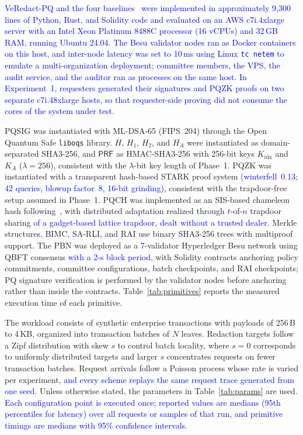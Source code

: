 \documentclass[lettersize,journal]{IEEEtran}
\newcommand{\chg}[1]{\textcolor{blue}{#1}}
\begin{document}
    \chg{VeRedact-PQ and the four baselines~\cite{ref1,ref13,ref27,ref34} were
    implemented in approximately 9{,}300 lines of Python, Rust, and Solidity
    code and evaluated on an AWS c7i.4xlarge server with an Intel Xeon
    Platinum 8488C processor (16 vCPUs) and 32\,GB RAM, running Ubuntu 24.04.
    The Besu validator nodes ran as Docker containers on this host, and
    inter-node latency was set to 10\,ms using Linux \texttt{tc netem} to
    emulate a multi-organization deployment; committee members, the VPS, the
    audit service, and the auditor ran as processes on the same host. In
    Experiment~1, requesters generated their signatures and PQZK proofs on
    two separate c7i.48xlarge hosts, so that requester-side proving did not
    consume the cores of the system under test.}

    PQSIG was instantiated with ML-DSA-65 (FIPS~204) through the Open Quantum
    Safe \texttt{liboqs} library. $H$, $H_1$, $H_2$, and $H_A$ were
    instantiated as domain-separated SHA3-256, and $\mathsf{PRF}$ as
    HMAC-SHA3-256 with 256-bit keys $K_{\mathrm{idx}}$
    and $K_A$ { ($\lambda=256$)}, consistent with the {$\lambda$}-bit key length of Phase~1. PQZK was instantiated with a transparent hash-based
    STARK proof system \chg{(winterfell~0.13; 42 queries, blowup factor~8,
    16-bit grinding)}, consistent with the
    trapdoor-free setup assumed in Phase~1. PQCH was implemented as an
    SIS-based chameleon hash following~\cite{ref10,ref17}, with distributed
    adaptation realized through $t$-of-$n$ trapdoor sharing
    \chg{of a gadget-based lattice trapdoor, dealt without a trusted dealer}. Merkle structures, BIMC, SA-RLI,
    and RAI use binary SHA3-256 trees with multiproof support. The PBN was
    deployed as a \chg{7}-validator Hyperledger Besu network using
    QBFT consensus \chg{with a 2-s block period}, with Solidity contracts anchoring policy commitments,
    committee configurations, batch checkpoints, and RAI checkpoints; PQ
    signature verification is performed by the validator nodes before
    anchoring rather than inside the contracts. Table~\ref{tab:primitives}
    reports the measured execution time of each primitive.

    The workload consists of synthetic enterprise transactions with payloads
    of 256\,B to 4\,KB, organized into transaction batches of $N$ leaves.
    Redaction targets follow a Zipf distribution with skew $s$ to control
    batch locality, where $s=0$ corresponds to uniformly distributed targets
    and larger $s$ concentrates requests on fewer transaction batches.
    Request arrivals follow a Poisson process whose rate is varied per
    experiment\chg{, and every scheme replays the same request trace generated
    from one seed}.
    Unless otherwise stated, the parameters in Table~\ref{tab:params} are
    used\chg{. Each configuration point is executed once; reported values are
    medians (95th percentiles for latency) over all requests or samples of
    that run, and primitive timings are medians with 95\% confidence
    intervals.}
\end{document}
